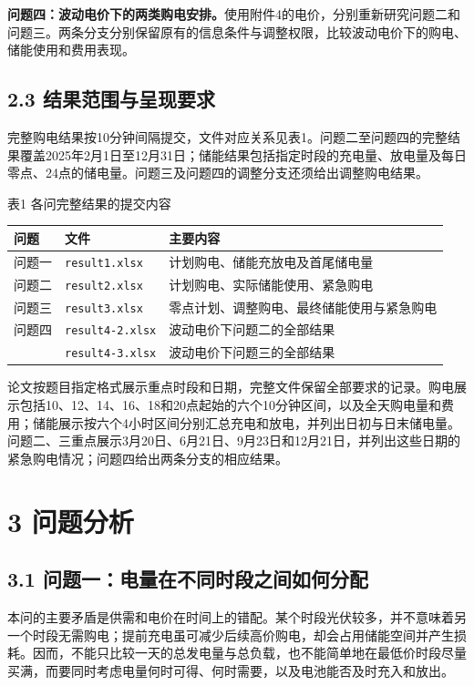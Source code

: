 \documentclass[11pt,a4paper]{article}
\begin{document}
\textbf{问题四：波动电价下的两类购电安排。}使用附件4的电价，分别重新研究问题二和问题三。两条分支分别保留原有的信息条件与调整权限，比较波动电价下的购电、储能使用和费用表现。

\subsection*{2.3 结果范围与呈现要求}
完整购电结果按10分钟间隔提交，文件对应关系见表1。问题二至问题四的完整结果覆盖2025年2月1日至12月31日；储能结果包括指定时段的充电量、放电量及每日零点、24点的储电量。问题三及问题四的调整分支还须给出调整购电结果。

\par\smallskip\noindent\begin{minipage}{\linewidth}
{\centering\small 表1 各问完整结果的提交内容\par}\smallskip
{\small\renewcommand{\arraystretch}{1.2}
\begin{tabularx}{\linewidth}{>{\raggedright\arraybackslash}p{1.4cm}>{\raggedright\arraybackslash}p{3.4cm}>{\raggedright\arraybackslash}X}
\toprule
问题 & 文件 & 主要内容 \\
\midrule
问题一 & \texttt{result1.xlsx} & 计划购电、储能充放电及首尾储电量 \\
问题二 & \texttt{result2.xlsx} & 计划购电、实际储能使用、紧急购电 \\
问题三 & \texttt{result3.xlsx} & 零点计划、调整购电、最终储能使用与紧急购电 \\
问题四 & \texttt{result4-2.xlsx} & 波动电价下问题二的全部结果 \\
 & \texttt{result4-3.xlsx} & 波动电价下问题三的全部结果 \\
\bottomrule
\end{tabularx}}
\end{minipage}\par\smallskip

论文按题目指定格式展示重点时段和日期，完整文件保留全部要求的记录。购电展示包括10、12、14、16、18和20点起始的六个10分钟区间，以及全天购电量和费用；储能展示按六个4小时区间分别汇总充电和放电，并列出日初与日末储电量。问题二、三重点展示3月20日、6月21日、9月23日和12月21日，并列出这些日期的紧急购电情况；问题四给出两条分支的相应结果。

\section*{3 问题分析}
\subsection*{3.1 问题一：电量在不同时段之间如何分配}
本问的主要矛盾是供需和电价在时间上的错配。某个时段光伏较多，并不意味着另一个时段无需购电；提前充电虽可减少后续高价购电，却会占用储能空间并产生损耗。因而，不能只比较一天的总发电量与总负载，也不能简单地在最低价时段尽量买满，而要同时考虑电量何时可得、何时需要，以及电池能否及时充入和放出。
\end{document}
